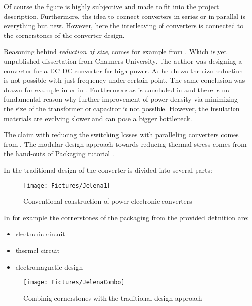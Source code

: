 \documentclass[]{scrartcl}
\begin{document}
\begin{enumerate}
	\newpage
	Of course the figure is highly subjective and made to fit into the project description. Furthermore, the idea to connect converters in series or in parallel is everything but new. However, here the interleaving of converters is connected to the cornerstones of the converter design. 
	
	Reasoning behind \emph{reduction of size}, comes for example from \cite{Bahmani2016a}. Which is yet unpublished dissertation from Chalmers University. The author was designing a converter for a DC DC converter for high power. As he shows the size reduction is not possible with just frequency under certain point. The same conclusion was drawn for example in \cite{Fan2011} or in \cite{Yang2015a}. Furthermore as is concluded in \cite{Hanson2016} and \cite{Kyaw2015} there is no fundamental reason why further improvement of power density via minimizing the size of the transformer  or capacitor is not possible. However, the insulation materials are evolving slower and can pose a bigger bottleneck.
	
	
	The claim with reducing the switching losses with paralleling converters comes from \cite{Kolar2015a}. The modular design approach towards reducing thermal stress comes from the hand-outs of Packaging tutorial \cite{Faculty2014a}.
	
	In \cite{Popovic2005} the traditional design of the converter is divided into several parts:
	\begin{figure}[h!]
		\centering
		\texttt{[image: Pictures/Jelena1]}
		\caption{Conventional construction of power electronic converters}
		\label{fig:jelena1}
	\end{figure}
	\newpage
	In for example \cite{Abraham2005} the cornerstones of the packaging from the provided definition are: 
	\begin{itemize}
		\item electronic circuit
		\item thermal circuit
		\item electromagnetic design
	\end{itemize}
	\begin{figure}[h!]
		\centering
		\texttt{[image: Pictures/JelenaCombo]}
		\caption{Combinig cornerstones with the traditional design approach}
		\label{fig:jelenacombo}
	\end{figure}
	
	
	\end{enumerate}
	
	
\end{document}
